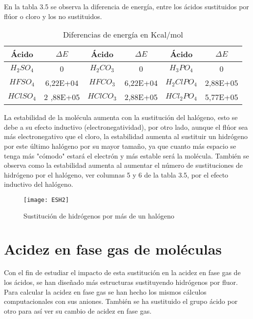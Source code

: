 En la tabla 3.5 se observa la diferencia de energía, entre los ácidos sustituidos por flúor o cloro y los no sustituidos.
\begin{table}
	\centering
	\begin{tabular}{|c|c|c|c|c|c|}
		\hline
		Ácido	& $\Delta E$ &	Ácido	& $\Delta E$ & Ácido & $\Delta E$\\ \hline
		$ H_2SO_4$	& 0	& $H_2CO_3$	 & 0 &	$H_3PO_4$	& 0 \\ \hline
		$HFSO_4$ &	6,22E+04	& $HFCO_3$	& 6,22E+04	& $H_2ClPO_4$	& 2,88E+05 \\ \hline
		$HClSO_4$ &	2 ,88E+05	& $HClCO_3$ &	2,88E+05	& $HCl_2PO_4$ &	5,77E+05 \\ \hline
	\end{tabular}
	\caption{Diferencias de energía en Kcal/mol}
\end{table}

La estabilidad de la molécula aumenta con la sustitución del halógeno, esto se debe a su efecto inductivo (electronegatividad), por otro lado, aunque el flúor sea más electronegativo que el cloro, la estabilidad aumenta al sustituir un hidrógeno por este último halógeno por su mayor tamaño, ya que cuanto más espacio se tenga más "cómodo" estará el electrón y más estable será la molécula.
También se observa como la estabilidad aumenta al aumentar el número de sustituciones de hidrógeno por el halógeno, ver columnas 5 y 6 de la tabla 3.5, por el efecto inductivo del halógeno.



\begin{figure}[h]
	\centering
	\texttt{[image: ESH2]}
	\caption{Sustitución de hidrógenos por más de un halógeno }
\end{figure}

\section{Acidez en fase gas de moléculas}

Con el fin de estudiar el impacto de esta sustitución en la acidez en fase gas de los ácidos, se han diseñado más estructuras sustituyendo hidrógenos por fluor. Para calcular la acidez en fase gas se han hecho los mismos cálculos computacionales con sus aniones.
También se ha sustituido el grupo ácido por otro para así ver su cambio de acidez en fase gas.

